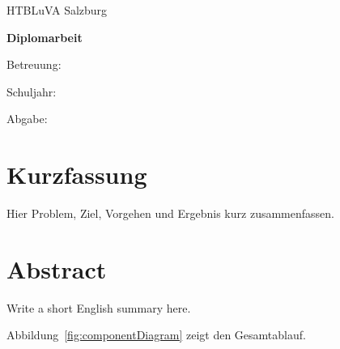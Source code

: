 \documentclass[12pt,a4paper,oneside]{scrreprt}
\begin{document}
\begin{titlepage}
\centering
{\Large HTBLuVA Salzburg\par}
\vspace{2cm}
{\huge\bfseries Diplomarbeit\par}
\vspace{1cm}
{\LARGE \Arbeitstitel\par}
\vspace{2cm}
{\large \Team\par}
\vfill
Betreuung: \Betreuung\par
Schuljahr: \Schuljahr\par
Abgabe: \Abgabedatum
\end{titlepage}
\chapter*{Kurzfassung}
Hier Problem, Ziel, Vorgehen und Ergebnis kurz zusammenfassen.
\chapter*{Abstract}
Write a short English summary here.
\tableofcontents
\clearpage
{}








\printbibliography[heading=bibintoc,title={Literaturverzeichnis}]
\appendix

Abbildung~\ref{fig:componentDiagram} zeigt den Gesamtablauf.
\end{document}
